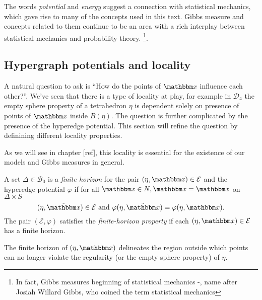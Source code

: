 The words \textit{potential} and \textit{energy} suggest a connection with statistical mechanics, which gave rise to many of the concepts used in this text. Gibbs measure and concepts related to them continue to be an area with a rich interplay between statistical mechanics and probability theory. \footnote{In fact, Gibbs measures beginning of statistical mechanics -, name after Josiah Willard Gibbs, who coined the term statistical mechanics}.




\subsection{Hypergraph potentials and locality}
A natural question to ask is ``How do the points of $\x$ influence each other?''. We've seen that there is a type of locality at play, for example in $\mathcal D_4$ the empty sphere property of a tetrahedron $\eta$ is dependent solely on presence of points of $\x$ inside $B(\eta)$. The question is further complicated by the presence of the hyperedge potential. This section will refine the question by definining different locality properties.

As we will see in chapter [ref], this locality is essential for the existence of our models and Gibbs measures in general.

\begin{definition}
	A set $\Delta \in \mathcal B_0$ is a \textit{finite horizon} for the pair $(\eta,\x) \in \mathcal E$ and the hyperedge potential $\varphi$ if for all $\tilde{\x} \in N, \tilde{\x} = \x$ on $\Delta\times S$ 
$$(\eta,\tilde{\x})\in\mathcal E \text{ and } \varphi(\eta,\tilde{\x}) = \varphi(\eta,\x). $$
The pair $(\mathcal E, \varphi)$ satisfies the \textit{finite-horizon property} if each $(\eta,\x)\in \mathcal E$ has a finite horizon.
\end{definition}

The finite horizon of $(\eta,\x)$ delineates the region outside which points can no longer violate the regularity (or the empty sphere property) of $\eta$. 

